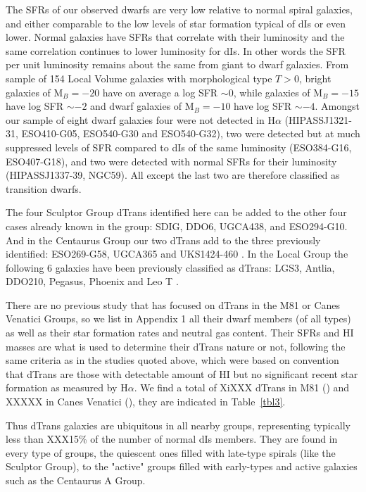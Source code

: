 \documentclass[12pt,preprint]{emulateapj}
\begin{document}
The SFRs of our observed dwarfs are very low relative to normal spiral galaxies, and 
either comparable to the low levels of star formation typical of dIs or even lower. Normal galaxies have SFRs that correlate with their luminosity 
and the same correlation continues to lower luminosity for dIs. In other words the SFR per unit luminosity remains about the same from giant to 
dwarf galaxies. From \cite{kai07}  sample of 154 Local Volume galaxies with morphological type $T>0$, bright galaxies of M$_B=-20$ have on average
a log SFR $\sim 0$, while galaxies of M$_B=-15$ have log SFR $\sim -2$ and dwarf galaxies of M$_B=-10$ have log SFR $\sim -4$.
Amongst our sample of eight dwarf galaxies four were not detected in H$\alpha$ (HIPASSJ1321-31, ESO410-G05, ESO540-G30 and ESO540-G32), two were detected but at much suppressed levels of SFR compared to dIs of  
 the same luminosity (ESO384-G16, ESO407-G18), and two were detected with normal SFRs for their luminosity (HIPASSJ1337-39, NGC59). 
All except the last two are therefore classified as transition dwarfs.

 The four Sculptor Group dTrans 
identified here can be added to the other four cases already known in the group: SDIG, DDO6, UGCA438, and ESO294-G10. And in the Centaurus Group
our two dTrans add to the three previously identified: ESO269-G58, UGCA365 and UKS1424-460 \citep{cds09}. In the Local Group the 
following 6 galaxies have been previously classified as dTrans: LGS3, Antlia, DDO210, Pegasus, Phoenix \citep{m98} and Leo T \cite{ibe07}.

There are no previous study that has focused on dTrans in the M81 or Canes Venatici Groups, so we list in 
Appendix 1 all their dwarf members (of all types) as well as their star formation rates and neutral gas content.
Their SFRs and HI masses are what is used to determine their dTrans nature or not, following the same criteria as in the studies quoted above, which were based on \citep{m98} convention that dTrans are those with detectable amount 
of HI but no significant recent star formation as measured by H$\alpha$.
We find a total of XiXXX dTrans in M81 () and XXXXX in Canes Venatici (), they are indicated in Table~\ref{tbl3}.

Thus dTrans galaxies are ubiquitous in all nearby groups, representing typically less than XXX15\% of the number 
of normal dIs members. They are found in every type of groups, the quiescent ones filled with late-type spirals 
(like the Sculptor Group), to the "active" groups filled with early-types and active galaxies such as the 
Centaurus A Group. 
\end{document}
